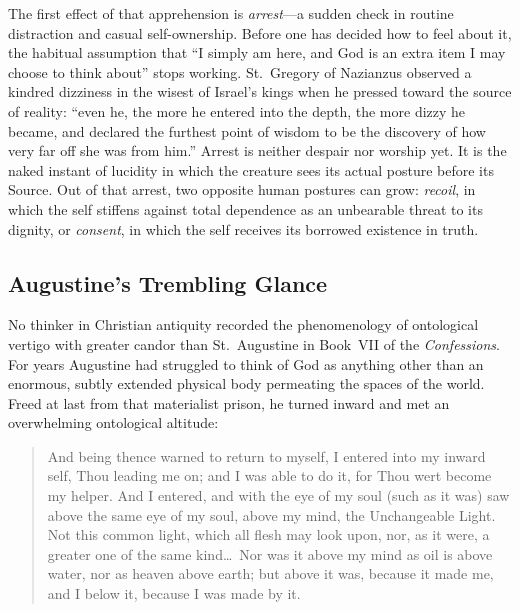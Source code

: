 The first effect of that apprehension is \emph{arrest}---a sudden check in routine distraction and casual self-ownership. Before one has decided how to feel about it, the habitual assumption that ``I simply am here, and God is an extra item I may choose to think about'' stops working. St.\ Gregory of Nazianzus observed a kindred dizziness in the wisest of Israel's kings when he pressed toward the source of reality: ``even he, the more he entered into the depth, the more dizzy he became, and declared the furthest point of wisdom to be the discovery of how very far off she was from him.'' Arrest is neither despair nor worship yet. It is the naked instant of lucidity in which the creature sees its actual posture before its Source. Out of that arrest, two opposite human postures can grow: \emph{recoil}, in which the self stiffens against total dependence as an unbearable threat to its dignity, or \emph{consent}, in which the self receives its borrowed existence in truth.

\subsection{Augustine's Trembling Glance}

No thinker in Christian antiquity recorded the phenomenology of ontological vertigo with greater candor than St.\ Augustine in Book~VII of the \emph{Confessions}. For years Augustine had struggled to think of God as anything other than an enormous, subtly extended physical body permeating the spaces of the world. Freed at last from that materialist prison, he turned inward and met an overwhelming ontological altitude:

\begin{quote}
And being thence warned to return to myself, I entered into my inward self, Thou leading me on; and I was able to do it, for Thou wert become my helper. And I entered, and with the eye of my soul (such as it was) saw above the same eye of my soul, above my mind, the Unchangeable Light. Not this common light, which all flesh may look upon, nor, as it were, a greater one of the same kind\dots\ Nor was it above my mind as oil is above water, nor as heaven above earth; but above it was, because it made me, and I below it, because I was made by it.
\end{quote}

